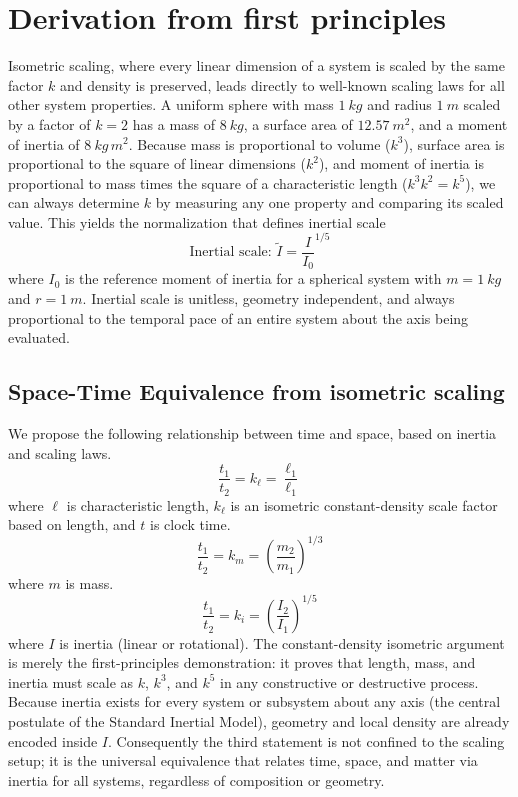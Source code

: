 \section{Derivation from first principles}
Isometric scaling, where every linear dimension of a system is scaled by the same factor $k$ and density is preserved, leads directly to well-known scaling laws for all other system properties. A uniform sphere with mass $1~\si{kg}$ and radius $1~\si{m}$ scaled by a factor of $k=2$ has a mass of $8~\si{kg}$, a surface area of $12.57~\si{m^2}$, and a moment of inertia of $8~\si{kg\,m^2}$. Because mass is proportional to volume ($k^3$), surface area is proportional to the square of linear dimensions ($k^2$), and moment of inertia is proportional to mass times the square of a characteristic length ($k^3 k^2 = k^5$), we can always determine $k$ by measuring any one property and comparing its scaled value. This yields the normalization that defines inertial scale
\[
\text{Inertial scale: } \tilde{I} = \frac{I}{I_0}^{1/5}
\]
where $I_0$ is the reference moment of inertia for a spherical system with $m=1~\si{kg}$ and $r=1~\si{m}$. Inertial scale is unitless, geometry independent, and always proportional to the temporal pace of an entire system about the axis being evaluated.

\subsection{Space-Time Equivalence from isometric scaling}
We propose the following relationship between time and space, based on inertia and scaling laws.
\[
\frac{t_1}{t_2} = k_\ell = \frac{\ell_1}{\ell_1}
\]
where $\ell$ is characteristic length, $k_\ell$ is an isometric constant-density scale factor based on length, and $t$ is clock time.
\[
\frac{t_1}{t_2} = k_m = \left(\frac{m_2}{m_1}\right)^{1/3}
\]
where $m$ is mass.
\[
\frac{t_1}{t_2} = k_i = \left(\frac{I_2}{I_1}\right)^{1/5}
\]
where $I$ is inertia (linear or rotational). The constant-density isometric argument is merely the first-principles demonstration: it proves that length, mass, and inertia must scale as $k$, $k^3$, and $k^5$ in any constructive or destructive process. Because inertia exists for every system or subsystem about any axis (the central postulate of the Standard Inertial Model), geometry and local density are already encoded inside $I$. Consequently the third statement is not confined to the scaling setup; it is the universal equivalence that relates time, space, and matter via inertia for all systems, regardless of composition or geometry.

